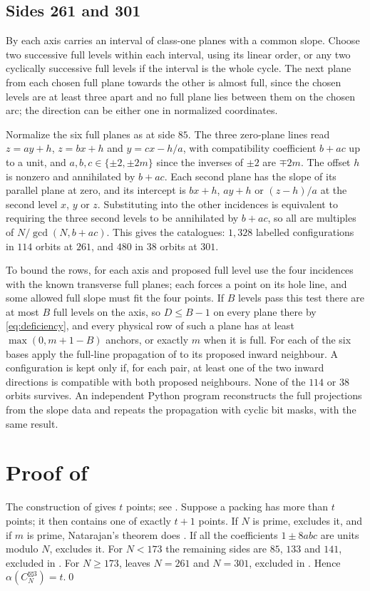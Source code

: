 \documentclass[11pt,colorlinks]{charlie}
\newcommand{\spow}{\boxtimes}
\begin{document}
\subsection{Sides 261 and 301}\label{sec:homogeneous}
By  each axis carries an interval of class-one planes with a common slope. Choose two successive full levels within each interval, using its linear order, or any two cyclically successive full levels if the interval is the whole cycle. The next plane from each chosen full plane towards the other is almost full, since the chosen levels are at least three apart and no full plane lies between them on the chosen arc; the direction can be either one in normalized coordinates.

Normalize the six full planes as at side $85$. The three zero-plane lines read $z=ay+h$, $z=bx+h$ and $y=cx-h/a$, with compatibility coefficient $b+ac$ up to a unit, and $a,b,c\in\{\pm2,\pm2m\}$ since the inverses of $\pm2$ are $\mp2m$. The offset $h$ is nonzero and annihilated by $b+ac$. Each second plane has the slope of its parallel plane at zero, and its intercept is $bx+h$, $ay+h$ or $(z-h)/a$ at the second level $x$, $y$ or $z$. Substituting into the other incidences is equivalent to requiring the three second levels to be annihilated by $b+ac$, so all are multiples of $N/\gcd(N,b+ac)$. This gives the catalogues: $1{,}328$ labelled configurations in $114$ orbits at $261$, and $480$ in $38$ orbits at $301$.

To bound the rows, for each axis and proposed full level use the four incidences with the known transverse full planes; each forces a point on its hole line, and some allowed full slope must fit the four points. If $B$ levels pass this test there are at most $B$ full levels on the axis, so $D\le B-1$ on every plane there by \eqref{eq:deficiency}, and every physical row of such a plane has at least $\max(0,m+1-B)$ anchors, or exactly $m$ when it is full. For each of the six bases apply the full-line propagation of  to its proposed inward neighbour. A configuration is kept only if, for each pair, at least one of the two inward directions is compatible with both proposed neighbours. None of the $114$ or $38$ orbits survives. An independent Python program reconstructs the full projections from the slope data and repeats the propagation with cyclic bit masks, with the same result.

\section{Proof of \texorpdfstring{}{the main theorem}}\label{sec:proof}
The construction of \cite{BBC} gives $t$ points; see \cite[Section~1.1]{BHN}. Suppose a packing has more than $t$ points; it then contains one of exactly $t+1$ points. If $N$ is prime, \cite[Theorem~1]{BHN} excludes it, and if $m$ is prime, Natarajan's theorem does \cite[Section~1]{BHN}. If all the coefficients $1\pm8abc$ are units modulo $N$,  excludes it. For $N<173$ the remaining sides are $85$, $133$ and $141$, excluded in . For $N\ge173$,  leaves $N=261$ and $N=301$, excluded in . Hence $\alpha(C_N^{\spow3})=t$.\qed
\end{document}
